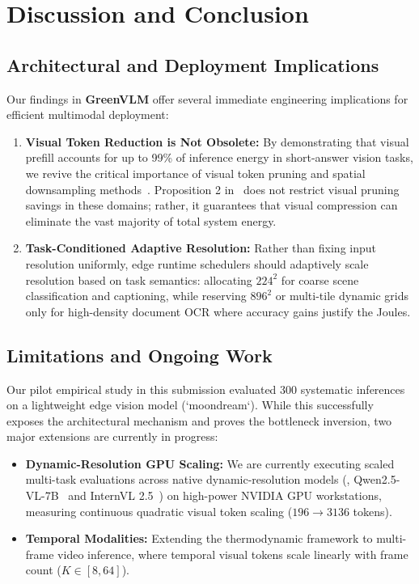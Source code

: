 \section{Discussion and Conclusion}
\label{sec:conclusion}

\subsection{Architectural and Deployment Implications}
Our findings in \textbf{GreenVLM} offer several immediate engineering implications for efficient multimodal deployment:
\begin{enumerate}[leftmargin=*]
    \item \textbf{Visual Token Reduction is Not Obsolete:} By demonstrating that visual prefill accounts for up to 99\% of inference energy in short-answer vision tasks, we revive the critical importance of visual token pruning and spatial downsampling methods~\cite{chen2024fastv, zhang2024sparsevlm, vasu2025fastvlm}. Proposition 2 in~\cite{zhan2026seeing} does not restrict visual pruning savings in these domains; rather, it guarantees that visual compression can eliminate the vast majority of total system energy.
    \item \textbf{Task-Conditioned Adaptive Resolution:} Rather than fixing input resolution uniformly, edge runtime schedulers should adaptively scale resolution based on task semantics: allocating $224^2$ for coarse scene classification and captioning, while reserving $896^2$ or multi-tile dynamic grids only for high-density document OCR where accuracy gains justify the Joules.
\end{enumerate}

\subsection{Limitations and Ongoing Work}
Our pilot empirical study in this submission evaluated 300 systematic inferences on a lightweight edge vision model (`moondream`). While this successfully exposes the architectural mechanism and proves the bottleneck inversion, two major extensions are currently in progress:
\begin{itemize}[leftmargin=*]
    \item \textbf{Dynamic-Resolution GPU Scaling:} We are currently executing scaled multi-task evaluations across native dynamic-resolution models (\eg, Qwen2.5-VL-7B~\cite{qwen2_5_vl_2025} and InternVL 2.5~\cite{chen2024internvl}) on high-power NVIDIA GPU workstations, measuring continuous quadratic visual token scaling ($196 \to 3136$ tokens).
    \item \textbf{Temporal Modalities:} Extending the thermodynamic framework to multi-frame video inference, where temporal visual tokens scale linearly with frame count ($K \in [8, 64]$).
\end{itemize}


